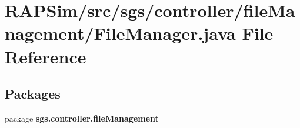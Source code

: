 \section{R\-A\-P\-Sim/src/sgs/controller/file\-Management/\-File\-Manager.java File Reference}
\label{_file_manager_8java}
\subsection*{Packages}
\begin{DoxyCompactItemize}
\item 
package {\bf sgs.\-controller.\-file\-Management}
\end{DoxyCompactItemize}
